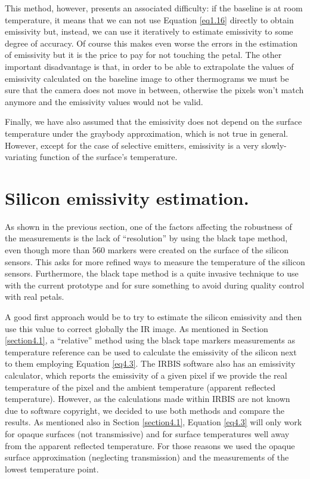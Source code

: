 		This method, however, presents an associated difficulty: if the baseline is at room temperature, it means that we can not use Equation \ref{eq1.16} directly to obtain emissivity but, instead, we can use it iteratively to estimate emissivity to some degree of accuracy. Of course this makes even worse the errors in the estimation of emissivity but it is the price to pay for not touching the petal. The other important disadvantage is that, in order to be able to extrapolate the values of emissivity calculated on the baseline image to other thermograms we must be sure that the camera does not move in between, otherwise the pixels won’t match anymore and the emissivity values would not be valid.
		
		Finally, we have also assumed that the emissivity does not depend on the surface temperature under the graybody approximation, which is not true in general. However, except for the case of selective emitters, emissivity is a very slowly-variating function of the surface’s temperature.\bigskip
		
	\section{Silicon emissivity estimation.}\label{section4.2}	
		
		As shown in the previous section, one of the factors affecting the robustness of the measurements is the lack of “resolution” by using the black tape method, even though more than 560 markers were created on the surface of the silicon sensors. This asks for more refined ways to measure the temperature of the silicon sensors. Furthermore, the black tape method is a quite invasive technique to use with the current prototype and for sure something to avoid during quality control with real petals.
		
		A good first approach would be to try to estimate the silicon emissivity and then use this value to correct globally the IR image. As mentioned in Section \ref{section4.1}, a “relative” method using the black tape markers measurements as temperature reference can be used to calculate the emissivity of the silicon next to them employing Equation \ref{eq4.3}. The IRBIS software also has an emissivity calculator, which reports the emissivity of a given pixel if we provide the real temperature of the pixel and the ambient temperature (apparent reflected temperature). However, as the calculations made within IRBIS are not known due to software copyright, we decided to use both methods and compare the results. As mentioned also in Section \ref{section4.1}, Equation \ref{eq4.3} will only work for opaque surfaces (not transmissive) and for surface temperatures well away from the apparent reflected temperature. For those reasons we used the opaque surface approximation (neglecting transmission) and the measurements of the lowest temperature point. 
		
